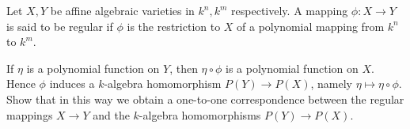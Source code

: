 \documentclass{standalone}
\theoremstyle{definition}
\theoremstyle{remark}
\begin{document}
Let $X, Y$ be affine algebraic varieties in $k^{n}, k^{m}$ respectively. A mapping $\phi: X \rightarrow Y$ is said to be regular if $\phi$ is the restriction to $X$ of a polynomial mapping from $k^{n}$ to $k^{m}$.

If $\eta$ is a polynomial function on $Y$, then $\eta \circ \phi$ is a polynomial function on $X$. Hence $\phi$ induces a $k$-algebra homomorphism $P(Y) \rightarrow P(X)$, namely $\eta \mapsto \eta \circ \phi$. Show that in this way we obtain a one-to-one correspondence between the regular mappings $X \rightarrow Y$ and the $k$-algebra homomorphisms $P(Y) \rightarrow P(X)$.
\end{document}
